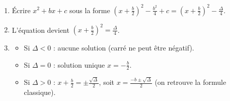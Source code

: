 \documentclass[11pt]{article}
\begin{document}
\begin{methode}[Résoudre $x^2 + bx + c = 0$ par la forme canonique ($a=1$)]
\begin{enumerate}
\item Écrire $x^2 + bx + c$ sous la forme $(x + \frac{b}{2})^2 - \frac{b^2}{4} + c = (x + \frac{b}{2})^2 - \frac{\Delta}{4}$.
\item L'équation devient $(x + \frac{b}{2})^2 = \frac{\Delta}{4}$.
\item \begin{itemize}
\item Si $\Delta < 0$ : aucune solution (carré ne peut être négatif).
\item Si $\Delta = 0$ : solution unique $x = -\frac{b}{2}$.
\item Si $\Delta > 0$ : $x + \frac{b}{2} = \pm \frac{\sqrt{\Delta}}{2}$, soit $x = \frac{-b \pm \sqrt{\Delta}}{2}$ (on retrouve la formule classique).
\end{itemize}
\end{enumerate}
\end{methode}
\end{document}
